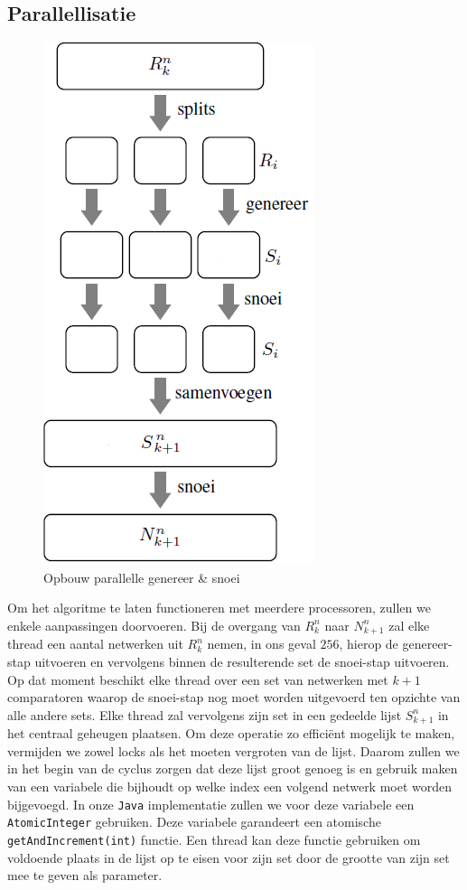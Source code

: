 \documentclass{article}
\begin{document}
\subsection{Parallellisatie}\label{Parallellisatie}
\begin{figure}
	\vspace{-15pt}
	\centering
	\includegraphics[scale=0.5]{Gen_Prune_Opbouw.png}
	\caption{Opbouw parallelle genereer \& snoei}
	\label{opbouwGenPrune}
\end{figure}
Om het algoritme te laten functioneren met meerdere processoren, zullen we enkele aanpassingen doorvoeren.
Bij de overgang van $R^n_k$ naar $N^n_{k+1}$ zal elke thread een aantal netwerken uit $R^n_k$ nemen, in ons geval $256$, hierop de genereer-stap uitvoeren en vervolgens binnen de resulterende set de snoei-stap uitvoeren.
Op dat moment beschikt elke thread over een set van netwerken met $k+1$ comparatoren waarop de snoei-stap nog moet worden uitgevoerd ten opzichte van alle andere sets.
Elke thread zal vervolgens zijn set in een gedeelde lijst $S^n_{k+1}$ in het centraal geheugen plaatsen.
Om deze operatie zo effici\"ent mogelijk te maken, vermijden we zowel locks als het moeten vergroten van de lijst. 
Daarom zullen we in het begin van de cyclus zorgen dat deze lijst groot genoeg is en gebruik maken van een variabele die bijhoudt op welke index een volgend netwerk moet worden bijgevoegd.
In onze \texttt{Java} implementatie zullen we voor deze variabele een \texttt{AtomicInteger} gebruiken.
Deze variabele garandeert een atomische \texttt{getAndIncrement(int)} functie.
Een thread kan deze functie gebruiken om voldoende plaats in de lijst op te eisen voor zijn set door de grootte van zijn set mee te geven als parameter.
\end{document}
